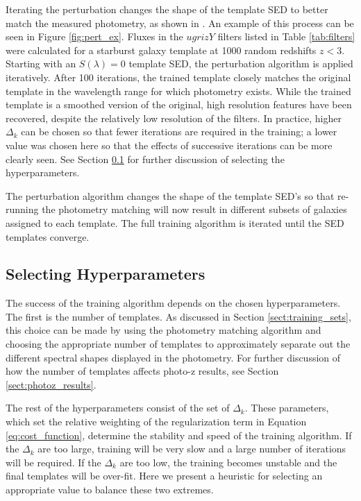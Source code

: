 \documentclass[twocolumn]{aastex63}
\begin{document}
    Iterating the perturbation changes the shape of the template SED to better match the measured photometry, as shown in \citet{Budavari2000b}. 
    An example of this process can be seen in Figure \ref{fig:pert_ex}. 
    Fluxes in the $ugrizY$ filters listed in Table \ref{tab:filters} were calculated for a starburst galaxy template at 1000 random redshifts $z < 3$. 
    Starting with an $S(\lambda) = 0$ template SED, the perturbation algorithm is applied iteratively. 
    After 100 iterations, the trained template closely matches the original template in the wavelength range for which photometry exists. 
    While the trained template is a smoothed version of the original, high resolution features have been recovered, despite the relatively low resolution of the filters. 
    In practice, higher $\Delta_k$ can be chosen so that fewer iterations are required in the training; a lower value was chosen here so that the effects of successive iterations can be more clearly seen.
    See Section \ref{sect:hyperparameters} for further discussion of selecting the hyperparameters.

    The perturbation algorithm changes the shape of the template SED's so that re-running the photometry matching will now result in different subsets of galaxies assigned to each template.
    The full training algorithm is iterated until the SED templates converge.




    \subsection{Selecting Hyperparameters}
    \label{sect:hyperparameters}

    The success of the training algorithm depends on the chosen hyperparameters.
    The first is the number of templates. 
    As discussed in Section \ref{sect:training_sets}, this choice can be made by using the photometry matching algorithm and choosing the appropriate number of templates to approximately separate out the different spectral shapes displayed in the photometry.
    For further discussion of how the number of templates affects photo-z results, see Section \ref{sect:photoz_results}.

    The rest of the hyperparameters consist of the set of $\Delta_k$.
    These parameters, which set the relative weighting of the regularization term in Equation \ref{eq:cost_function}, determine the stability and speed of the training algorithm.
    If the $\Delta_k$ are too large, training will be very slow and a large number of iterations will be required. 
    If the $\Delta_k$ are too low, the training becomes unstable and the final templates will be over-fit.
    Here we present a heuristic for selecting an appropriate value to balance these two extremes.
\end{document}
